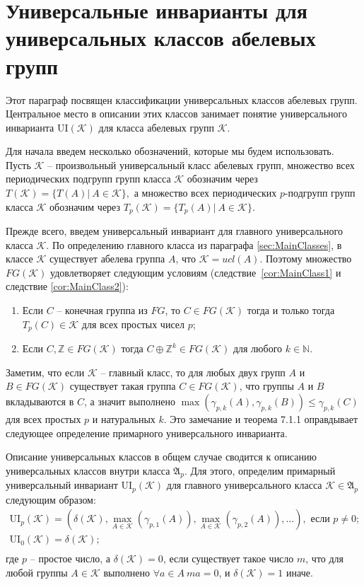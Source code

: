 \documentclass[a4paper,11pt,twoside]{article}
\def\A{{\mathfrak{A}}}
\def\K{{\mathcal{K}}}
\def\Z{{\mathbb{Z}}}
\def\N{{\mathbb{N}}}
\def\ui{{\mathrm{UI}}}
\begin{document}
\section{Универсальные инварианты для универсальных классов абелевых групп}

Этот параграф посвящен классификации универсальных классов абелевых групп. Центральное место в описании этих классов занимает понятие универсального инварианта $\ui(\K)$ для класса абелевых групп $\K$. 

Для начала введем несколько обозначений, которые мы будем использовать. Пусть $\K$ -- произвольный универсальный класс абелевых групп, множество всех периодических подгрупп групп класса $\K$ обозначим через $T(\K) = \{ T(A) | \ A \in \K\},$ а множество всех периодических $p$-подгрупп групп класса $\K$ обозначим через $T_p(\K) = \{ T_p(A) | \ A \in \K\}.$

Прежде всего, введем универсальный инвариант для главного универсального класса $\K$. По определению главного класса из параграфа \ref{sec:MainClasses}, в классе $\K$ существует абелева группа $A$, что $\K = ucl(A).$ Поэтому множество $FG(\K)$ удовлетворяет следующим условиям (следствие~\ref{cor:MainClass1} и следствие \ref{cor:MainClass2}):
\begin{enumerate}
\item Если $C$ -- конечная группа из $FG$, то $C \in FG(\K)$ тогда и только тогда $T_p(C) \in \K$ для всех простых чисел $p$;
\item Если $C, \Z \in FG(\K)$ тогда $C \oplus \Z^k \in FG(\K)$ для любого $k \in \N.$
\end{enumerate}

Заметим, что если $\K$ -- главный класс, то для любых двух групп $A$ и $B \in FG(\K)$ существует такая группа $C \in FG(\K)$, что группы $A$ и $B$ вкладываются в $C$, а значит выполнено $\max(\gamma_{p,k}(A), \gamma_{p,k}(B)) \leq \gamma_{p,k}(C)$ для всех простых $p$ и натуральных $k$. Это замечание и теорема 7.1.1 \cite{Hodges} оправдывает следующее определение примарного универсального инварианта.

Описание универсальных классов в общем случае сводится к описанию универсальных классов внутри класса $\A_p$. Для этого, определим примарный универсальный инвариант $\ui_p(\K)$ для главного универсального класса $\K \in \A_p$ следующим образом:
$$\begin{array}{c}
\ui_p(\K) = (\delta(\K),  \max\limits_{A \in \K}(\gamma_{p,1}(A)), \max\limits_{A \in \K}(\gamma_{p,2}(A)), \ldots), \text{ если } p \neq 0; \\
\ui_0(\K) = \delta(\K); \\
\end{array}$$
где $p$ -- простое число, а $\delta(\K) = 0$, если существует такое число $m$, что для любой группы $A \in \K$ выполнено $\forall a \in A \ ma=0$, и $\delta(\K) = 1$ иначе.
\end{document}
